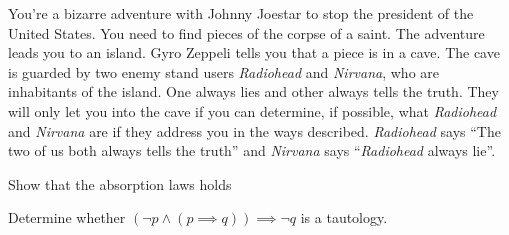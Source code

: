 \documentclass[a4paper]{exam}
\begin{document}
\begin{questions}
     You're a bizarre adventure with Johnny Joestar to stop the president of the United States. You need to find pieces of the corpse of a saint.
    The adventure leads you to an island. 
    Gyro Zeppeli tells you that a piece is in a cave. The cave is guarded by two enemy stand users \emph{Radiohead} and \emph{Nirvana}, who are inhabitants of the island. One always lies and other always tells the truth.
    They will only let you into the cave if you can determine, if possible, what \emph{Radiohead} and \emph{Nirvana} are if they address you in the ways described.
    \emph{Radiohead} says ``The two of us both always tells the truth'' and \emph{Nirvana} says ``\emph{Radiohead} always lie''.
    \begin{solution}
    \end{solution}

    Show that the absorption laws holds 
    

     Determine whether $(\neg p \land (p \implies q)) \implies \neg q$ is a tautology.
    \begin{solution}
    \end{solution}


      
\end{questions}
\end{document}
